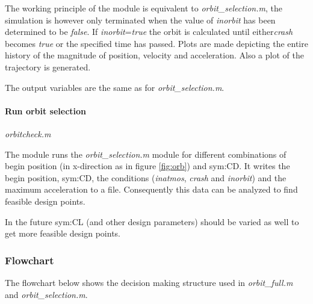 The working principle of the module is equivalent to \textit{orbit\_selection.m}, the simulation is however only terminated when the value of \textit{inorbit} has been determined to be \textit{false}. If \textit{inorbit}=\textit{true} the orbit is calculated until either\textit{crash} becomes \textit{true} or the specified time has passed. Plots are made depicting the entire history of the magnitude of position, velocity and acceleration. Also a plot of the trajectory is generated.

The output variables are the same as for \textit{orbit\_selection.m}.

\paragraph{Run orbit selection} \textit{orbitcheck.m}

The module runs the \textit{orbit\_selection.m} module for different combinations of begin position (in x-direction as in figure \ref{fig:orb}) and \gls{sym:CD}. It writes the begin position, \gls{sym:CD}, the conditions (\textit{inatmos}, \textit{crash} and \textit{inorbit}) and the maximum acceleration to a file. Consequently this data can be analyzed to find feasible design points.

In the future \gls{sym:CL} (and other design parameters) should be varied as well to get more feasible design points.

\subsubsection{Flowchart} \label{subsec:flow}

The flowchart below shows the decision making structure used in \textit{orbit\_full.m} and \textit{orbit\_selection.m}.

